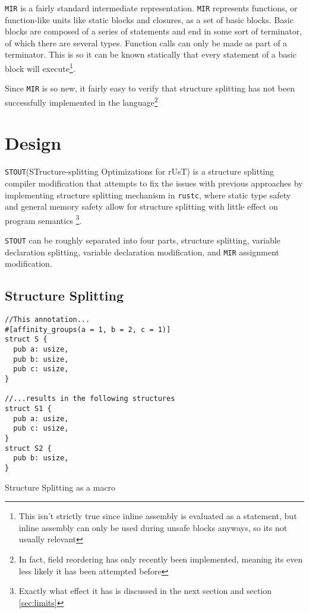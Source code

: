 \documentclass[12pt,oneside]{book}
\newcommand{\rustcname}{{\texttt{rustc}}}
\def \rustc {\rustcname{}\xspace}
\newcommand{\mirname}{{\texttt{MIR}}}
\def \mir {\mirname{}\xspace}
\newcommand{\projectname}{{\texttt{STOUT}}}
\def \name{\projectname\xspace}
\begin{document}
\mir is a fairly standard intermediate representation. \mir represents functions, 
or function-like units like static blocks and closures, 
as a set of basic blocks. Basic blocks are composed of a series of statements
and end in some sort of terminator, of which there are several types. 
Function calls can only be made as part of a terminator. This is
so it can be known statically that every statement of a basic block will
execute\footnote{This isn't strictly true since inline assembly is evaluated as
  a statement, but inline assembly can only be used during unsafe blocks
  anyways, so its not usually relevant}.

  Since \mir is so new, it fairly easy to verify that structure splitting has
  not been successfully implemented in the language\footnote{In fact, field
  reordering has only recently been implemented, meaning its even less
  likely it has been attempted before}

\chapter{Design}

\name (STructure-splitting Optimizations for rUsT) is a structure 
splitting compiler modification that attempts to fix the issues with
previous approaches by implementing structure splitting 
mechanism in \rustc, where static type
safety and general memory safety allow for 
structure splitting with little effect on program
semantics
\footnote{Exactly what effect it has is discussed in the next section and section \ref{sec:limits}}.

\name can be roughly separated into 
four parts, 
structure splitting, 
variable declaration splitting,
variable declaration modification,
and 
\mir assignment modification.

\section{Structure Splitting}

\begin{listing}[h]
\begin{verbatim}
//This annotation...
#[affinity_groups(a = 1, b = 2, c = 1)]
struct S {
  pub a: usize,
  pub b: usize,
  pub c: usize,
}

//...results in the following structures
struct S1 {
  pub a: usize,
  pub c: usize,
}
struct S2 {
  pub b: usize,
}
\end{verbatim}
  \caption{Structure Splitting as a macro}
  \label{fig:split}
\end{listing}
\end{document}
